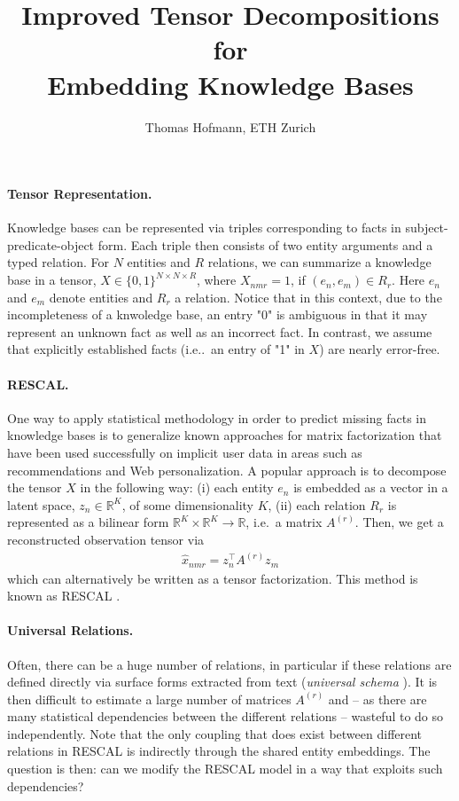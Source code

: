 \documentclass{article}
\title{Improved Tensor Decompositions for \\ Embedding Knowledge Bases}
\author{Thomas Hofmann, ETH Zurich}
\renewcommand{\Re}{{\mathbb R}}
\begin{document}
\maketitle 

\paragraph{Tensor Representation.} Knowledge bases can be represented via triples corresponding to facts in subject-predicate-object form. Each triple then consists of two entity arguments and a typed relation. For $N$ entities and $R$ relations, we can summarize a knowledge base in a tensor, $X \in \{0,1\}^{N \times N \times R}$, where $X_{nmr}=1$, if $(e_n,  e_m) \in R_r$. Here $e_n$ and $e_m$ denote entities and $R_r$ a relation.  Notice that in this context, due to the incompleteness of a knwoledge base, an entry "0" is ambiguous in that it may represent an unknown fact as well as an incorrect fact. In contrast, we assume that explicitly established facts (i.e..~an entry of "1" in $X$) are nearly error-free. 

\paragraph{RESCAL.} One way to apply statistical methodology in order to predict missing facts in knowledge bases is to generalize known approaches for matrix factorization that have been used successfully on implicit user data in areas such as recommendations and Web personalization. A popular approach is to decompose the tensor $X$ in the following way: (i) each entity $e_n$ is embedded as a vector in a latent space, $z_n \in \Re^K$, of some dimensionality $K$, (ii) each relation $R_r$ is represented as a bilinear form $\Re^K \times \Re^K \to \Re$, i.e.~a matrix $A^{(r)}$. Then, we get a reconstructed observation tensor via 
\begin{align}
\hat x_{nmr} = z_n^\top A^{(r)} z_{m} 
\end{align}
which can alternatively be written as a tensor factorization. This method is known as RESCAL \cite{nickel2011three}.

\paragraph{Universal Relations.} Often, there can be a huge number of relations, in particular if these relations are defined directly via surface forms extracted from text (\textit{universal schema} \cite{riedel2013relation}). It is then difficult to estimate a large number of matrices $A^{(r)}$ and -- as there are many statistical dependencies between the different relations -- wasteful to do so independently.  Note that the only coupling that does exist between different relations in RESCAL is indirectly through the shared entity embeddings. The question is then: can we modify the RESCAL model in a way that exploits such dependencies? 
\end{document}
